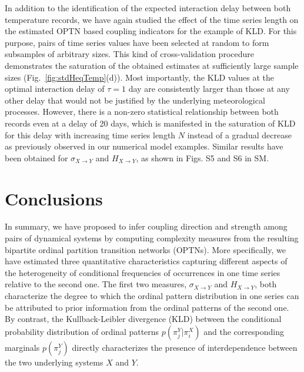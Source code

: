 \documentclass[12pt,aip,cha,reprint,nofootinbib]{revtex4-1}
\begin{document}
In addition to the identification of the expected interaction delay between both temperature records, we have again studied the effect of the time series length on the estimated OPTN based coupling indicators for the example of KLD. For this purpose, pairs of time series values have been selected at random to form subsamples of arbitrary sizes. This kind of cross-validation procedure demonstrates the saturation of the obtained estimates at sufficiently large sample sizes (Fig.~\ref{fig:stdHeqTemp}(d)). Most importantly, the KLD values at the optimal interaction delay of $\tau=1$ day are consistently larger than those at any other delay that would not be justified by the underlying meteorological processes. However, there is a non-zero statistical relationship between both records even at a delay of 20 days, which is manifested in the saturation of KLD for this delay with increasing time series length $N$ instead of a gradual decrease as previously observed in our numerical model examples. {\color{red}Similar results have been obtained for $\sigma_{X\to Y}$ and $H_{X\to Y}$, as shown in Figs. S5 and S6 in SM. }

\section{Conclusions} \label{sec:con}

In summary, we have proposed to infer coupling direction and strength among pairs of dynamical systems by computing complexity measures from the resulting bipartite ordinal {\color{red}partition} transition networks (OPTNs). More specifically, we have estimated three quantitative characteristics capturing different aspects of the heterogeneity of conditional frequencies of occurrences in one time series relative to the second one. The first two measures, $\sigma_{X\to Y}$ and $H_{X\to Y}$, both characterize the degree to which the ordinal pattern distribution in one series can be attributed to prior information from the ordinal patterns of the second one. By contrast, the Kullback-Leibler divergence (KLD) between the conditional probability distribution of ordinal patterns $p(\pi_{j}^{Y} | \pi_i^{X})$ and the corresponding marginals $p(\pi_j^{Y})$ directly characterizes the presence of interdependence between the two underlying systems $X$ and $Y$. 
\end{document}
